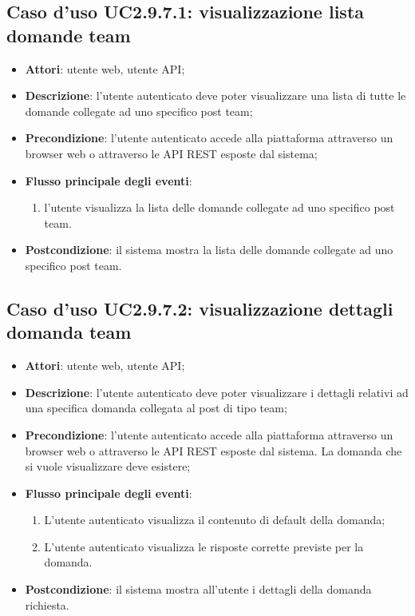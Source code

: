 \subsection{Caso d'uso UC2.9.7.1: visualizzazione lista domande team}
\begin{itemize}
\item \textbf{Attori}: utente web, utente API;
\item \textbf{Descrizione}: l'utente autenticato deve poter visualizzare una lista di tutte le domande collegate ad uno specifico post team; 
      \item \textbf{Precondizione}: l'utente autenticato accede alla piattaforma attraverso un browser web o attraverso le API REST esposte dal sistema;

        \item \textbf{Flusso principale degli eventi}:
          \begin{enumerate}
          \item l'utente visualizza la lista delle domande collegate ad uno specifico post team.

      \end{enumerate}
    \item \textbf{Postcondizione}: il sistema mostra la lista delle domande collegate ad uno specifico post team.
  \end{itemize}
\hypertarget{UC2.9.7.2}{}
\subsection{Caso d'uso UC2.9.7.2: visualizzazione dettagli domanda team}
\begin{itemize}
\item \textbf{Attori}: utente web, utente API;
\item \textbf{Descrizione}: l'utente autenticato deve poter visualizzare i dettagli relativi ad una specifica domanda collegata al post di tipo team; 
      \item \textbf{Precondizione}: l'utente autenticato accede alla piattaforma attraverso un browser web o attraverso le API REST esposte dal sistema. La domanda che si vuole visualizzare deve esistere;

        \item \textbf{Flusso principale degli eventi}:
          \begin{enumerate}
          \item L'utente autenticato visualizza il contenuto di default della domanda;
          \item L'utente autenticato visualizza le risposte corrette previste per la domanda.

      \end{enumerate}
    \item \textbf{Postcondizione}: il sistema mostra all'utente i dettagli della domanda richiesta.
  \end{itemize}
\hypertarget{UC2.9.7.3}{}
